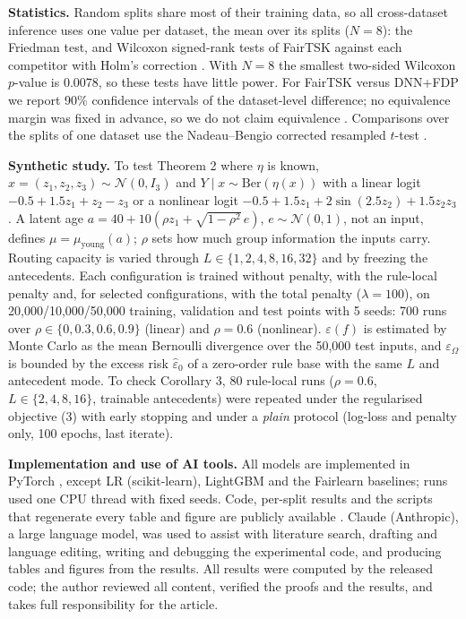 \documentclass[pdflatex,sn-basic,Numbered,lineno]{sn-jnl}
\begin{document}
\textbf{Statistics.} Random splits share most of their training data, so all cross-dataset inference uses one value per dataset, the mean over its splits (\(N = 8\)): the Friedman test, and Wilcoxon signed-rank tests of FairTSK against each competitor with Holm's correction \cite{demsar,holm}. With \(N = 8\) the smallest two-sided Wilcoxon \(p\)-value is 0.0078, so these tests have little power. For FairTSK versus DNN+FDP we report 90\% confidence intervals of the dataset-level difference; no equivalence margin was fixed in advance, so we do not claim equivalence \cite{schuirmann}. Comparisons over the splits of one dataset use the Nadeau--Bengio corrected resampled \(t\)-test \cite{nadeau}.

\textbf{Synthetic study.} To test Theorem 2 where \(\eta\) is known, \(x = (z_1,z_2,z_3) \sim \mathcal{N}(0,I_3)\) and \(Y \mid x \sim \mathrm{Ber}(\eta(x))\) with a linear logit \(-0.5 + 1.5z_1 + z_2 - z_3\) or a nonlinear logit \(-0.5 + 1.5z_1 + 2\sin(2.5z_2) + 1.5z_2z_3\). A latent age \(a = 40 + 10(\rho z_1 + \sqrt{1 - \rho^2}\,e)\), \(e \sim \mathcal{N}(0,1)\), not an input, defines \(\mu = \mu_{\text{young}}(a)\); \(\rho\) sets how much group information the inputs carry. Routing capacity is varied through \(L \in \{1,2,4,8,16,32\}\) and by freezing the antecedents. Each configuration is trained without penalty, with the rule-local penalty and, for selected configurations, with the total penalty (\(\lambda = 100\)), on 20,000/10,000/50,000 training, validation and test points with 5 seeds: 700 runs over \(\rho \in \{0,0.3,0.6,0.9\}\) (linear) and \(\rho = 0.6\) (nonlinear). \(\varepsilon(f)\) is estimated by Monte Carlo as the mean Bernoulli divergence over the 50,000 test inputs, and \(\varepsilon_\Omega\) is bounded by the excess risk \(\hat\varepsilon_0\) of a zero-order rule base with the same \(L\) and antecedent mode. To check Corollary 3, 80 rule-local runs (\(\rho = 0.6\), \(L \in \{2,4,8,16\}\), trainable antecedents) were repeated under the regularised objective (3) with early stopping and under a \emph{plain} protocol (log-loss and penalty only, 100 epochs, last iterate).

\textbf{Implementation and use of AI tools.} All models are implemented in PyTorch \cite{pytorch}, except LR (scikit-learn), LightGBM and the Fairlearn baselines; runs used one CPU thread with fixed seeds. Code, per-split results and the scripts that regenerate every table and figure are publicly available \cite{software}. Claude (Anthropic), a large language model, was used to assist with literature search, drafting and language editing, writing and debugging the experimental code, and producing tables and figures from the results. All results were computed by the released code; the author reviewed all content, verified the proofs and the results, and takes full responsibility for the article.
\end{document}
